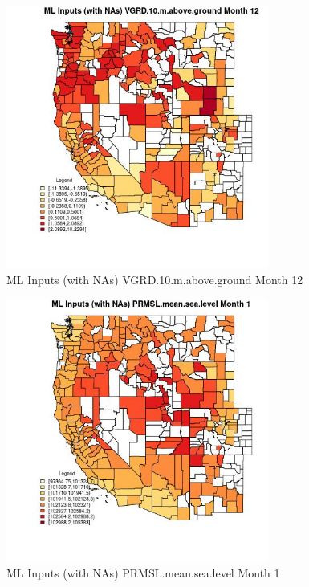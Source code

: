 \begin{figure} 
\centering  
\includegraphics[width=0.77\textwidth]{Code_Outputs/Report_ML_input_PM25_Step4_part_f_de_duplicated_aveswNAs_CountyVGRD10mabovegroundmedianMonth12.jpg} 
\caption{\label{fig:Report_ML_input_PM25_Step4_part_f_de_duplicated_aveswNAsCountyVGRD10mabovegroundmedianMonth12}ML Inputs (with NAs) VGRD.10.m.above.ground Month 12} 
\end{figure} 
 

\begin{figure} 
\centering  
\includegraphics[width=0.77\textwidth]{Code_Outputs/Report_ML_input_PM25_Step4_part_f_de_duplicated_aveswNAs_CountyPRMSLmeansealevelmedianMonth1.jpg} 
\caption{\label{fig:Report_ML_input_PM25_Step4_part_f_de_duplicated_aveswNAsCountyPRMSLmeansealevelmedianMonth1}ML Inputs (with NAs) PRMSL.mean.sea.level Month 1} 
\end{figure} 
 

